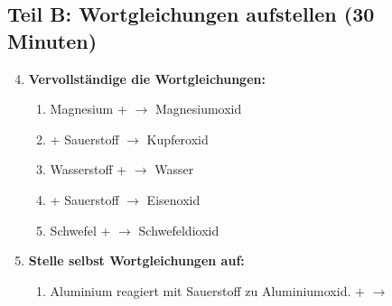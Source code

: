 \subsection*{Teil B: Wortgleichungen aufstellen (30 Minuten)}

\begin{enumerate}[label=\arabic*.]
    \setcounter{enumi}{3}

    \item \textbf{Vervollständige die Wortgleichungen:}
    \vspace{0.5cm}

    \begin{enumerate}[label=\alph*)]
        \item Magnesium + \underline{\hspace{4cm}} $\rightarrow$ Magnesiumoxid
        \vspace{0.5cm}

        \item \underline{\hspace{4cm}} + Sauerstoff $\rightarrow$ Kupferoxid
        \vspace{0.5cm}

        \item Wasserstoff + \underline{\hspace{4cm}} $\rightarrow$ Wasser
        \vspace{0.5cm}

        \item \underline{\hspace{4cm}} + Sauerstoff $\rightarrow$ Eisenoxid
        \vspace{0.5cm}

        \item Schwefel + \underline{\hspace{4cm}} $\rightarrow$ Schwefeldioxid
        \vspace{0.5cm}
    \end{enumerate}

    \vspace{1cm}

    \item \textbf{Stelle selbst Wortgleichungen auf:}
    \vspace{0.5cm}

    \begin{enumerate}[label=\alph*)]
        \item Aluminium reagiert mit Sauerstoff zu Aluminiumoxid.
        \vspace{1cm}
        \underline{\hspace{4cm}} + \underline{\hspace{4cm}} $\rightarrow$ \underline{\hspace{4cm}}


\end{enumerate}
\end{enumerate}
